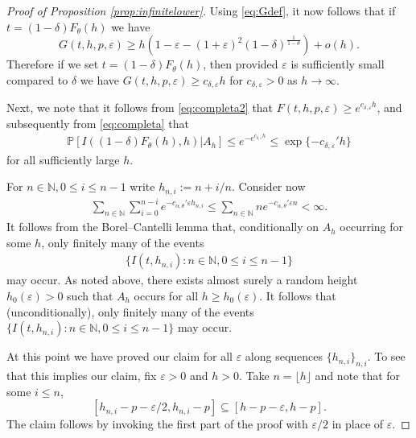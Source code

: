 \documentclass[a4,12pt]{amsart}
\numberwithin{equation}{section}
\begin{document}
\begin{proof}[Proof of Proposition \ref{prop:infinitelower}]
Using \eqref{eq:Gdef}, it now follows that if $t = (1-\delta)F_\theta(h)$ 
we have
\begin{equation*}
    G(t,h,p,\varepsilon) \geq h\left(1-\varepsilon-(1+\varepsilon)^2(1-\delta)^{\frac{1}{1-\theta}}\right) + o(h).
\end{equation*}
Therefore if we set $t = (1-\delta)F_\theta(h)$, then provided $\varepsilon$ is sufficiently small compared to $\delta$ we have $G(t,h,p,\varepsilon) \geq c_{\delta,\varepsilon} h $  for $c_{\delta, \varepsilon}>0$ as $h \to \infty$. 

Next, we note that it follows from \eqref{eq:completa2} that $F(t,h,p,\varepsilon) \geq e^{ c_{\delta,\varepsilon}h}$, and subsequently from \eqref{eq:completa} that
\begin{align*}
\mathbb{P}[ I((1-\delta)F_\theta(h),h) | A_h ] \leq e^{ - e^{ c_{\delta,\varepsilon}h}} \leq \exp\{ - c_{\delta,\varepsilon}' h\}
\end{align*}
for all sufficiently large $h$. 

\color{black}
For $n \in \mathbb{N}, 0 \leq i \leq n-1$ write $h_{n,i} := n+i/n$. 
Consider now  
\begin{align*}
\sum_{n \in \mathbb{N}} \sum_{i=0}^{n-i} e^{ - c_{\alpha,\theta}'\varepsilon h_{n,i}} \leq \sum_{n \in \mathbb{N}} n e^{ - c_{\alpha,\theta}'\varepsilon n} < \infty.
\end{align*}
 It follows from the Borel--Cantelli lemma that, conditionally on $A_h$ occurring for some $h$, only finitely many of the events
 \begin{align*}
 \{ I(t,h_{n,i}) : n \in \mathbb{N}, 0 \leq i \leq n-1 \} 
 \end{align*}
 may occur.
 As noted above, there exists almost surely a random height $h_0(\varepsilon) > 0$ such that $A_h$ occurs for all $h \geq h_0(\varepsilon)$.
 It follows that (unconditionally), only finitely many of the events $ \{ I(t,h_{n,i}) : n \in \mathbb{N}, 0 \leq i \leq n-1 \} $ may occur.

At this point we have proved our claim for all $\varepsilon$ along sequences $\{h_{n,i}\}_{n,i}$. To see that this implies our claim,
fix $\varepsilon>0$ and $h>0$. 
Take $n = \lfloor h \rfloor$ and note that for some $i\leq n$, 
\[
	[h_{n,i} -p -\varepsilon/2, h_{n,i}-p] \subseteq [h-p-\varepsilon, h-p].
\]
The claim follows by invoking the first part of the proof with $\varepsilon/2$ in place of $\varepsilon$. 


\end{proof}
\end{document}
